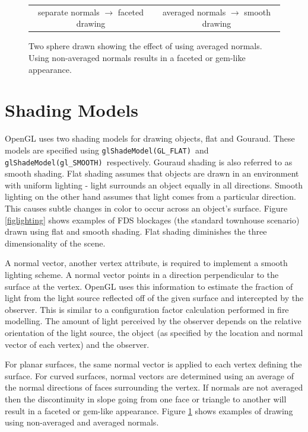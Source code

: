 \documentclass[11pt,twoside]{book}
\begin{document}
\begin{figure}[t]
\begin{center}
\begin{tabular}{cc}
separate normals $\rightarrow$ faceted drawing&averaged normals $\rightarrow$ smooth drawing\\
\end{tabular}
\end{center}
\caption {Two sphere drawn showing the effect of using averaged
normals.  Using non-averaged normals results in a faceted or
gem-like appearance. } \label{fignormals}
\end{figure}



\chapter{Shading Models} OpenGL uses two shading models for drawing
objects, flat and Gouraud.  These models are specified
using {\tt glShadeModel(GL\_FLAT)}\ and {\tt glShadeModel(gl\_SMOOTH)}\
respectively.
Gouraud shading is also
referred to as smooth shading.  Flat shading assumes that objects
are drawn in an environment with uniform lighting - light
surrounds an object equally in all directions. Smooth lighting on
the other hand assumes that light comes from a particular
direction.  This causes subtle changes in color to occur across an
object's surface. Figure \ref{figlighting} shows examples of FDS
blockages (the standard townhouse scenario) drawn using flat and
smooth shading. Flat shading diminishes the three dimensionality of
the scene.

A normal vector, another vertex attribute, is required to
implement a smooth lighting scheme. A normal vector points in a
direction perpendicular to the surface at the vertex. OpenGL uses
this information to estimate the fraction of light from the light
source reflected off of the given surface and intercepted by the
observer.  This is similar to a configuration factor calculation
performed in fire modelling.  The amount of light perceived by the
observer depends on the relative orientation of the light source,
the object (as specified by the location and normal vector of each
vertex) and the observer.

For planar surfaces, the same normal vector is applied to each
vertex defining the surface. For curved surfaces, normal vectors
are determined using an average of the normal directions of faces
surrounding the vertex.  If normals are not averaged then the
discontinuity in slope going from one face or triangle to another
will result in a faceted or gem-like appearance.  Figure
\ref{fignormals} shows examples of drawing using non-averaged and
averaged normals.
\end{document}
